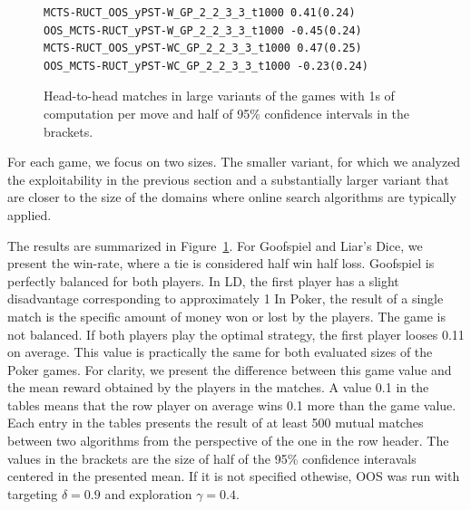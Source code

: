 \documentclass{aamas2015}
\begin{document}
\begin{figure}
\small
\begin{verbatim}
MCTS-RUCT_OOS_yPST-W_GP_2_2_3_3_t1000 0.41(0.24)
OOS_MCTS-RUCT_yPST-W_GP_2_2_3_3_t1000 -0.45(0.24)
MCTS-RUCT_OOS_yPST-WC_GP_2_2_3_3_t1000 0.47(0.25)
OOS_MCTS-RUCT_yPST-WC_GP_2_2_3_3_t1000 -0.23(0.24)
\end{verbatim}


\caption{Head-to-head matches in large variants of the games with 1s of computation per move and half of 95\% confidence intervals in the brackets.}\label{fig:matches}
\end{figure}

For each game, we focus on two sizes. The smaller variant, for which we analyzed the exploitability in the previous section and a substantially larger variant that are closer to the size of the domains where online search algorithms are typically applied. 





The results are summarized in Figure~\ref{fig:matches}.
For Goofspiel and Liar's Dice, we present the win-rate, where a tie is considered half win half loss. Goofspiel is perfectly balanced for both players. In LD, the first player has a slight disadvantage corresponding to approximately 1%
In Poker, the result of a single match is the specific amount of money won or lost by the players.
The game is not balanced. If both players play the optimal strategy, the first player looses 0.11 on average.
This value is practically the same for both evaluated sizes of the Poker games.
For clarity, we present the difference between this game value and the mean reward obtained by the players in the matches. A value 0.1 in the tables means that the row player on average wins 0.1 more than the game value.
Each entry in the tables presents the result of at least 500 mutual matches between two algorithms from the perspective of the one in the row header. The values in the brackets are the size of half of the 95\% confidence interavals centered in the presented mean. If it is not specified othewise, OOS was run with targeting $\delta=0.9$ and exploration $\gamma=0.4$.
\end{document}
